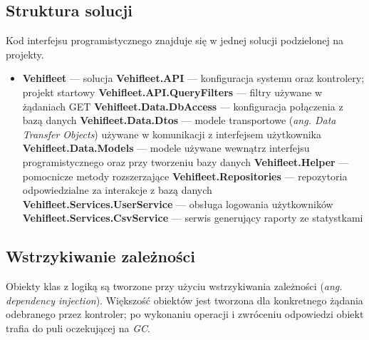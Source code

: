 \documentclass[eng,printmode,openany]{mgr}
\begin{document}
	\subsection{Struktura solucji}
	Kod interfejsu programistycznego znajduje się w jednej solucji podzielonej na projekty.
	\begin{itemize}
		\item \textbf{Vehifleet} — solucja
		\subitem \textbf{Vehifleet.API} — konfiguracja systemu oraz kontrolery; projekt startowy
		\subitem \textbf{Vehifleet.API.QueryFilters} — filtry używane w żądaniach GET
		\subitem \textbf{Vehifleet.Data.DbAccess} — konfiguracja połączenia z bazą danych
		\subitem \textbf{Vehifleet.Data.Dtos} — modele transportowe (\textit{ang. Data Transfer Objects}) używane w komunikacji z interfejsem użytkownika
		\subitem \textbf{Vehifleet.Data.Models} — modele używane wewnątrz interfejsu programistycznego oraz przy tworzeniu bazy danych
		\subitem \textbf{Vehifleet.Helper} — pomocnicze metody rozszerzające \cite{msdn-extension}
		\subitem \textbf{Vehifleet.Repositories} — repozytoria odpowiedzialne za interakcje z bazą danych
		\subitem \textbf{Vehifleet.Services.UserService} — obsługa logowania użytkowników
		\subitem \textbf{Vehifleet.Services.CsvService} — serwis generujący raporty ze statystkami
	\end{itemize}

	\subsection{Wstrzykiwanie zależności}
	Obiekty klas z logiką są tworzone przy użyciu wstrzykiwania zależności (\textit{ang. dependency injection}). Większość obiektów jest tworzona dla konkretnego żądania odebranego przez kontroler; po wykonaniu operacji i zwróceniu odpowiedzi obiekt trafia do puli oczekującej na \textit{GC}.
	
\end{document}

